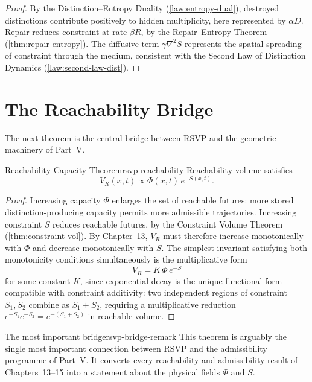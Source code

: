\documentclass[12pt,twoside,openright]{book}
\begin{document}
\begin{proof}
  By the Distinction--Entropy Duality
  (\cref{law:entropy-dual}), destroyed distinctions
  contribute positively to hidden multiplicity, here
  represented by $\alpha D$. Repair reduces constraint at
  rate $\beta R$, by the Repair--Entropy Theorem
  (\cref{thm:repair-entropy}). The diffusive term
  $\gamma\nabla^2 S$ represents the spatial spreading of
  constraint through the medium, consistent with the
  Second Law of Distinction Dynamics
  (\cref{law:second-law-dist}).
\end{proof}

\section{The Reachability Bridge}
\label{sec:ch16-bridge}

The next theorem is the central bridge between RSVP and the
geometric machinery of Part~V.

\begin{theorem}{Reachability Capacity Theorem}{rsvp-reachability}
  Reachability volume satisfies
  \[
    V_R(x,t) \propto \Phi(x,t)\, e^{-S(x,t)}.
  \]
\end{theorem}

\begin{proof}
  Increasing capacity $\Phi$ enlarges the set of reachable
  futures: more stored distinction-producing capacity
  permits more admissible trajectories. Increasing
  constraint $S$ reduces reachable futures, by the
  Constraint Volume Theorem (\cref{thm:constraint-vol}).
  By Chapter~13, $V_R$ must therefore increase monotonically
  with $\Phi$ and decrease monotonically with $S$. The
  simplest invariant satisfying both monotonicity
  conditions simultaneously is the multiplicative form
  \[
    V_R = K\, \Phi\, e^{-S}
  \]
  for some constant $K$, since exponential decay is the
  unique functional form compatible with constraint
  additivity: two independent regions of constraint
  $S_1, S_2$ combine as $S_1 + S_2$, requiring a
  multiplicative reduction $e^{-S_1}e^{-S_2} = e^{-(S_1+S_2)}$
  in reachable volume.
\end{proof}

\begin{remark}{The most important bridge}{rsvp-bridge-remark}
  This theorem is arguably the single most important
  connection between RSVP and the admissibility programme
  of Part~V. It converts every reachability and
  admissibility result of Chapters~13--15 into a statement
  about the physical fields $\Phi$ and $S$.
\end{remark}
\end{document}
